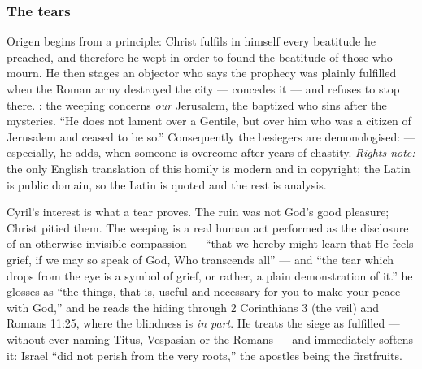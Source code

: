 \subsubsection*{The tears}

\begin{witnessnote}
Origen begins from a principle: Christ fulfils in himself every beatitude he
preached, and therefore he wept in order to found the beatitude of those who
mourn. He then stages an objector who says the prophecy was plainly fulfilled
when the Roman army destroyed the city --- concedes it --- and refuses to
stop there. : the weeping
concerns \textit{our} Jerusalem, the baptized who sins after the mysteries.
``He does not lament over a Gentile, but over him who was a citizen of
Jerusalem and ceased to be so.'' Consequently the besiegers are
demonologised:  --- especially, he adds, when someone is
overcome after years of chastity. \textit{Rights note:} the only English
translation of this homily is modern and in copyright; the Latin is
public domain, so the Latin is quoted and the rest is analysis.
\end{witnessnote}

\begin{witnessnote}
Cyril's interest is what a tear proves. The ruin was not God's good pleasure;
Christ pitied them. The weeping is a real human act performed as the
disclosure of an otherwise invisible compassion --- ``that we hereby might
learn that He feels grief, if we may so speak of God, Who transcends all''
--- and ``the tear which drops from the eye is a symbol of grief, or rather, a
plain demonstration of it.''  he glosses as ``the
things, that is, useful and necessary for you to make your peace with God,''
and he reads the hiding through 2 Corinthians 3 (the veil) and Romans 11:25,
where the blindness is \textit{in part}. He treats the siege as fulfilled ---
without ever naming Titus, Vespasian or the Romans --- and immediately
softens it: Israel ``did not perish from the very roots,'' the apostles being
the firstfruits.
\end{witnessnote}

